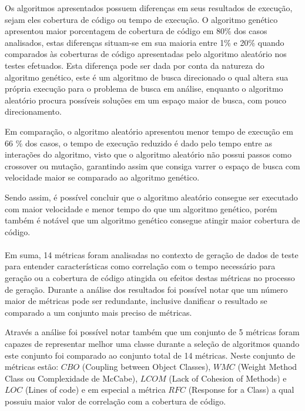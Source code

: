 \documentclass[
	12pt,				%
	oneside,			%
	a4paper,			%
	english,			%
	brazil				%
	]{abntex2ppgsi}
\begin{document}
Os algoritmos apresentados possuem diferenças em seus resultados de execução, sejam eles cobertura de código ou tempo de execução. O algoritmo genético apresentou maior porcentagem de cobertura de código em 80\% dos casos analisados, estas diferenças situam-se em sua maioria entre 1\% e 20\% quando comparados às coberturas de código apresentadas pelo algoritmo aleatório nos testes efetuados. Esta diferença pode ser dada por conta da natureza do algoritmo genético, este é um algoritmo de busca direcionado o qual altera sua própria execução para o problema de busca em análise, enquanto o algoritmo aleatório procura possíveis soluções em um espaço maior de busca, com pouco direcionamento.

Em comparação, o algoritmo aleatório apresentou menor tempo de execução em 66 \% dos casos, o tempo de execução reduzido é dado pelo tempo entre as interações do algoritmo, visto que o algoritmo aleatório não possui passos como crossover ou mutação, garantindo assim que consiga varrer o espaço de busca com velocidade maior se comparado ao algoritmo genético.

Sendo assim, é possível concluir que o algoritmo aleatório consegue ser executado com maior velocidade e menor tempo do que um algoritmo genético, porém também é notável que um algoritmo genético consegue atingir maior cobertura de código.\\

\\

Em suma, 14 métricas foram analisadas no contexto de geração de dados de teste para entender características como correlação com o tempo necessário para geração ou a cobertura de código atingida ou efeitos destas métricas no processo de geração. Durante a análise dos resultados foi possível notar que um número maior de métricas pode ser redundante, inclusive danificar o resultado se comparado a um conjunto mais preciso de métricas.

Através a análise foi possível notar também que um conjunto de 5 métricas foram capazes de representar melhor uma classe durante a seleção de algoritmos quando este conjunto foi comparado ao conjunto total de 14 métricas. Neste conjunto de métricas estão: $CBO$ (Coupling between Object Classes), $WMC$ (Weight Method Class ou Complexidade de McCabe), $LCOM$ (Lack of Cohesion of Methods) e $LOC$ (Lines of code) e em especial a métrica $RFC$ (Response for a Class) a qual possuiu maior valor de correlação com a cobertura de código.
\end{document}
